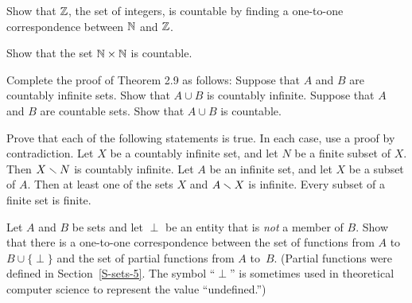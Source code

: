 \begin{exercises}
\problem Show that ${\mathbb Z}$, the set of integers, is countable by finding
a one-to-one correspondence between ${\mathbb N}$ and ${\mathbb Z}$.

\problem Show that the set ${\mathbb N}\times{\mathbb N}$ is countable.

\problem Complete the proof of Theorem 2.9 as follows:
\ppart Suppose that $A$ and $B$ are countably infinite sets.
Show that $A\cup B$ is countably infinite.
\ppart Suppose that $A$ and $B$ are countable sets.
Show that $A\cup B$ is countable.

\problem Prove that each of the following statements is true.
In each case, use a proof by contradiction.
\ppart Let $X$ be a countably infinite set, and let $N$ be a finite
subset of $X$.  Then $X\smallsetminus N$ is countably infinite.
\ppart Let $A$ be an infinite set, and let $X$ be a subset of $A$.
Then at least one of the sets $X$ and $A\smallsetminus X$ is infinite.
\ppart Every subset of a finite set is finite.

\problem Let $A$ and $B$ be sets and let $\perp$ be an entity that is \emph{not}
a member of $B$.  Show that there is a one-to-one correspondence between
the set of functions from $A$ to $B\cup\{\perp\}$ and the set of
partial functions from $A$ to~$B$.  (Partial functions were defined
in Section~\ref{S-sets-5}.  The symbol ``$\perp$'' is sometimes used in
theoretical computer science to represent the value ``undefined.'')

\end{exercises}


